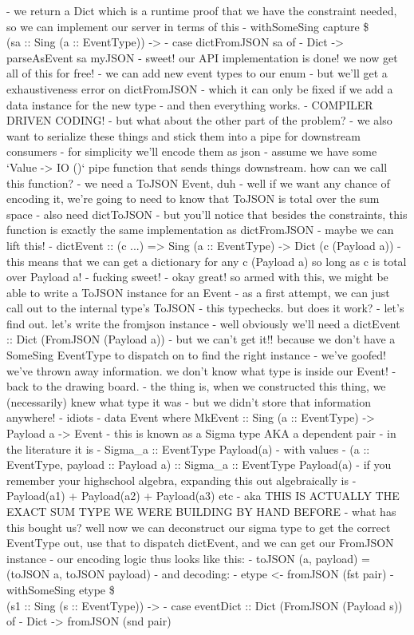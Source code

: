     - we return a Dict which is a runtime proof that we have the constraint needed, so we can implement our server in terms of this
- withSomeSing capture \$ \\(sa :: Sing (a :: EventType)) ->
  - case dictFromJSON sa of
    - Dict -> parseAsEvent sa myJSON
- sweet! our API implementation is done! we now get all of this for free!
  - we can add new event types to our enum
  - but we'll get a exhaustiveness error on dictFromJSON
  - which it can only be fixed if we add a data instance for the new type
  - and then everything works.
  - COMPILER DRIVEN CODING!
- but what about the other part of the problem?
  - we also want to serialize these things and stick them into a pipe for downstream consumers
  - for simplicity we'll encode them as json
  - assume we have some `Value -> IO ()` pipe function that sends things downstream. how can we call this function?
    - we need a ToJSON Event, duh
    - well if we want any chance of encoding it, we're going to need to know that ToJSON is total over the sum space
    - also need dictToJSON
  - but you'll notice that besides the constraints, this function is exactly the same implementation as dictFromJSON
    - maybe we can lift this!
      - dictEvent :: (c ...) => Sing (a :: EventType) -> Dict (c (Payload a))
    - this means that we can get a dictionary for any c (Payload a) so long as c is total over Payload a!
      - fucking sweet!
  - okay great! so armed with this, we might be able to write a ToJSON instance for an Event
    - as a first attempt, we can just call out to the internal type's ToJSON
    - this typechecks. but does it work?
    - let's find out. let's write the fromjson instance
      - well obviously we'll need a dictEvent :: Dict (FromJSON (Payload a))
      - but we can't get it!! because we don't have a SomeSing EventType to dispatch on to find the right instance
      - we've goofed! we've thrown away information. we don't know what type is inside our Event!
- back to the drawing board.
  - the thing is, when we constructed this thing, we (necessarily) knew what type it was
    - but we didn't store that information anywhere!
    - idiots
  - data Event where MkEvent :: Sing (a :: EventType) -> Payload a -> Event
  - this is known as a Sigma type AKA a dependent pair
    - in the literature it is
    - Sigma_{a :: EventType} Payload(a)
      - with values
      - (a :: EventType, payload :: Payload a) :: Sigma_{a :: EventType} Payload(a)
    - if you remember your highschool algebra, expanding this out algebraically is
    - Payload(a1) + Payload(a2) + Payload(a3) etc
    - aka THIS IS ACTUALLY THE EXACT SUM TYPE WE WERE BUILDING BY HAND BEFORE
  - what has this bought us? well now we can deconstruct our sigma type to get the correct EventType out, use that to dispatch dictEvent, and we can get our FromJSON instance
  - our encoding logic thus looks like this:
    - toJSON (a, payload) = (toJSON a, toJSON payload)
  - and decoding:
    - etype <- fromJSON (fst pair)
    - withSomeSing etype \$ \\(s1 :: Sing (s :: EventType)) ->
      - case eventDict :: Dict (FromJSON (Payload s)) of
        - Dict -> fromJSON (snd pair)

